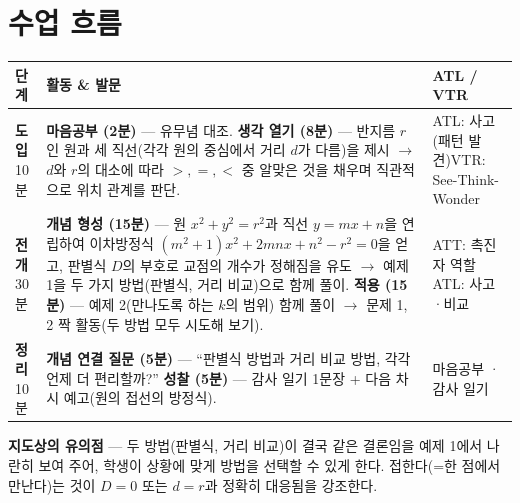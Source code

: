 \documentclass[11pt,a4paper]{article}
\begin{document}
\section{수업 흐름}
\begin{tabularx}{\linewidth}{@{}>{\centering\arraybackslash}p{1.6cm}X>{\raggedright\arraybackslash\small}p{3.1cm}@{}}
\toprule
\textbf{단계} & \textbf{활동 \& 발문} & \textbf{ATL / VTR} \\
\midrule
\textcolor{goldstrong}{\textbf{도입}}\newline\footnotesize 10분 &
\textbf{마음공부 (2분)} --- 유무념 대조.\newline
\textbf{생각 열기 (8분)} --- 반지름 $r$인 원과 세 직선(각각 원의 중심에서 거리 $d$가 다름)을 제시 $\to$ $d$와 $r$의 대소에 따라 $>,=,<$ 중 알맞은 것을 채우며 직관적으로 위치 관계를 판단. &
ATL: 사고(패턴 발견)\newline VTR: See-Think-Wonder \\
\addlinespace
\textcolor{goldstrong}{\textbf{전개}}\newline\footnotesize 30분 &
\textbf{개념 형성 (15분)} --- 원 $x^2+y^2=r^2$과 직선 $y=mx+n$을 연립하여 이차방정식 $(m^2+1)x^2+2mnx+n^2-r^2=0$을 얻고, 판별식 $D$의 부호로 교점의 개수가 정해짐을 유도 $\to$ 예제 1을 두 가지 방법(판별식, 거리 비교)으로 함께 풀이.\newline
\textbf{적용 (15분)} --- 예제 2(만나도록 하는 $k$의 범위) 함께 풀이 $\to$ 문제 1, 2 짝 활동(두 방법 모두 시도해 보기). &
ATT: 촉진자 역할\newline ATL: 사고·비교 \\
\addlinespace
\textcolor{goldstrong}{\textbf{정리}}\newline\footnotesize 10분 &
\textbf{개념 연결 질문 (5분)} --- ``판별식 방법과 거리 비교 방법, 각각 언제 더 편리할까?''\newline
\textbf{성찰 (5분)} --- 감사 일기 1문장 + 다음 차시 예고(원의 접선의 방정식). &
마음공부 · 감사 일기 \\
\bottomrule
\end{tabularx}

\begin{calloutbox}
\textbf{지도상의 유의점} --- 두 방법(판별식, 거리 비교)이 결국 같은 결론임을 예제 1에서 나란히 보여 주어, 학생이 상황에 맞게 방법을 선택할 수 있게 한다. 접한다(=한 점에서 만난다)는 것이 $D=0$ 또는 $d=r$과 정확히 대응됨을 강조한다.
\end{calloutbox}
\end{document}
